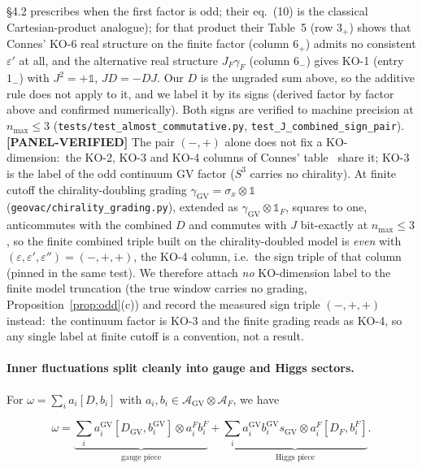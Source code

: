 \documentclass[11pt]{article}
\begin{document}
\S 4.2 prescribes when the first factor is odd; their eq.~(10) is the
classical Cartesian-product analogue); for that product their Table~5
(row $3_+$) shows that Connes' KO-6 real structure on the finite factor
(column $6_+$) admits no consistent $\varepsilon'$ at all, and the
alternative real structure $J_F \gamma_F$ (column $6_-$) gives KO-1
(entry $1_-$) with $J^2 = +\mathbb{1}$, $J D = -D J$.  Our $D$ is the ungraded sum above, so the
additive rule does not apply to it, and we label it by its signs
(derived factor by factor above and confirmed numerically).  Both
signs are verified to machine precision at $n_{\max} \le
3$ (\texttt{tests/test\_almost\_commutative.py},
\texttt{test\_J\_combined\_sign\_pair}).  \textbf{[PANEL-VERIFIED]} The
pair $(-, +)$ alone does not fix a KO-dimension:\ the KO-2, KO-3 and
KO-4 columns of Connes' table~\cite{connes1995,vansuijlekom_book2015} share it; KO-3 is the label of the odd
continuum GV factor ($S^3$ carries no chirality).  At finite cutoff the chirality-doubling grading
$\gamma_{\mathrm{GV}} = \sigma_x \otimes \mathbb{1}$
(\texttt{geovac/chirality\_grading.py}), extended as
$\gamma_{\mathrm{GV}} \otimes \mathbb{1}_F$, squares to one,
anticommutes with the combined $D$ and commutes with $J$ bit-exactly
at $n_{\max} \le 3$, so the finite combined triple built on the
chirality-doubled model is \emph{even} with
$(\varepsilon, \varepsilon', \varepsilon'') = (-, +, +)$, the KO-4
column, i.e.\ the sign triple of that column (pinned in the same test).  We therefore
attach \emph{no} KO-dimension label to the finite model truncation
(the true window carries no grading, Proposition~\ref{prop:odd}(c)) and
record the measured sign triple $(-, +, +)$ instead:\ the continuum
factor is KO-3 and the finite grading reads as KO-4, so any single
label at finite cutoff is a convention, not a result.

\paragraph{Inner fluctuations split cleanly into gauge and Higgs
sectors.}  For $\omega = \sum_i a_i [D, b_i]$ with $a_i, b_i \in
\mathcal{A}_{\mathrm{GV}} \otimes \mathcal{A}_F$, we have

\begin{equation}
\label{eq:omega_decomp}
\omega = \underbrace{\sum_i a_i^{\mathrm{GV}} [D_{\mathrm{GV}},
b_i^{\mathrm{GV}}] \otimes a_i^F b_i^F}_{\text{gauge piece}} +
\underbrace{\sum_i a_i^{\mathrm{GV}} b_i^{\mathrm{GV}}
s_{\mathrm{GV}} \otimes a_i^F [D_F, b_i^F]}_{\text{Higgs
piece}}.
\end{equation}
\end{document}
